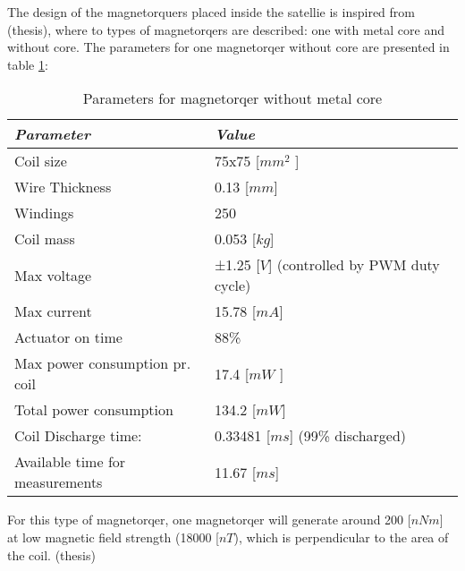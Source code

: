 The design of the magnetorquers placed inside the satellie is inspired from (thesis), where to types of magnetorqers are described: one with metal core and without core. The parameters for one magnetorqer without core are presented in table \ref{table:for}:

\begin{table}[H]
	\centering
	\begin{tabular}{|l|l|}
		\hline
		\textit{\textbf{Parameter}}     & \textit{\textbf{Value}}                     				     \\ \hline
		Coil size                       		   & 75x75 {[}$mm^2$ {]}                      					  \\ \hline
		Wire Thickness                      & 0.13 {[}$mm${]}                             					 	\\ \hline
		Windings                        		& 250                                          						     	 \\ \hline
		Coil mass                     		    & 0.053 [$kg$]                                    					    \\ \hline
		Max voltage                  	      & ±1.25 {[}$V${]} (controlled by PWM duty cycle) 		\\ \hline
		Max current                  	      & 15.78 {[}$mA${]}                               						   \\ \hline
		Actuator on time                   & 88\%                                      				                        \\ \hline
		Max power consumption pr. coil  & 17.4 {[}$mW$ {]}                            					     \\ \hline
		Total power consumption     & 134.2 {[}$mW${]}                           	  					   	    \\ \hline
		Coil Discharge time:             & 0.33481 {[}$ms${]} (99\% discharged)   					     \\ \hline
		Available time for measurements & 11.67 {[}$ms${]}                               					     \\ \hline
	\end{tabular}
	\caption{Parameters for magnetorqer without metal core}
		\label{table:for}
\end{table}

For this type of magnetorqer, one magnetorqer will generate around 200 [$nNm$] at low magnetic field strength (18000 [$nT$), which is perpendicular to the area of the coil. (thesis)

